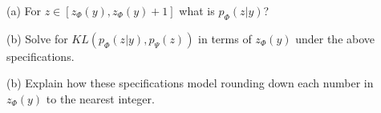 \documentclass{article}
\newcommand{\solution}[1]{}
\begin{document}
\medskip
(a) For $z \in [z_\Phi(y),z_\Phi(y)+1]$ what is $p_\Phi(z|y)$?

\solution{1}

\medskip
(b) Solve for $KL(p_\Phi(z|y),p_\Psi(z))$ in terms of $z_\Phi(y)$ under the above specifications.

\solution{
\begin{eqnarray*}
  & & KL(p_\Phi(z|y),p_\Psi(z)) \\
  \\
  & = & E_{z \sim P_\Phi(z|y)}\;\ln\frac{p_\Phi(z_\Phi(y)}{p_\Psi(z)} \\
  \\
  & = & E_{z \sim P_\Phi(z|y)} \;\sum_i \ln \frac{1}{1/(s_{\mathrm{max}}z[i])} \\
  \\
  & = & \sum_i E_{z[i]}\;\ln (s_{\mathrm{max}}z[i]) \\
  \\
  & = & \left(\sum_i \int_{z_\Phi(y)[i]}^{z_\Phi(y)[i]+1} \ln z\; dz\right) + d \ln s_{\mathrm{max}} \\
  \\
  & = & \left(\sum_i [z\ln z]_{z_\Phi(y)[i]}^{z_\Phi(y)[i]+1} \right) + d \ln s_{\mathrm{max}}
  \\
  & = & \left(\sum_i \ln (z_\Phi(y)[i] + 1) + z_\Phi(y)[i](\ln (z_\Phi(y)[i] + 1) - \ln z_\Phi(y)[i]) \right) + d \ln s_{\mathrm{max}} \\
  \\
  & = & \left(\sum_i \ln (z_\Phi(y)[i] + 1) + z_\Phi(y)[i]\ln \left(1+ \frac{1}{z_\Phi(y)[i]}\right) \right) + d \ln s_{\mathrm{max}} \\
  \\
  & \approx & \left(\sum_i \ln z_\Phi(y)[i] \right) + d \ln s_{\mathrm{max}} \;\;\;\mbox{for $z_\Phi(y)[i] >> 1$}
\end{eqnarray*}
}

\medskip
(b) Explain how these specifications model rounding down each number in $z_\Phi(y)$ to the nearest integer.
\end{document}
